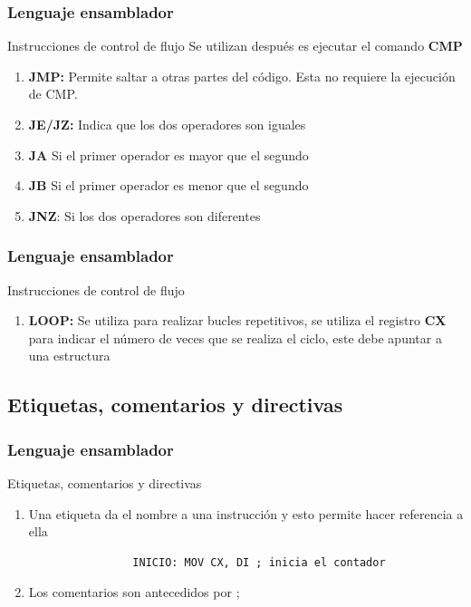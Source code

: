 \documentclass{beamer}
\begin{document}
\begin{frame}
	\frametitle{Lenguaje ensamblador}
	\begin{block}{Instrucciones de control de flujo}
	Se utilizan después es ejecutar el comando \textbf{CMP}
		\begin{enumerate}
			\item \textbf{JMP:} Permite saltar a otras partes del código. Esta no requiere la ejecución de CMP.
			\item \textbf{JE/JZ:} Indica que los dos operadores son iguales
			\item \textbf{JA} Si el primer operador es mayor que el segundo
			\item \textbf{JB} Si el primer operador es menor que el segundo
			\item \textbf{JNZ}: Si los dos operadores son diferentes
		\end{enumerate}
	\end{block}
\end{frame}

\begin{frame}
	\frametitle{Lenguaje ensamblador}
	\begin{block}{Instrucciones de control de flujo}
			\begin{enumerate}
			\item \textbf{LOOP:} Se utiliza para realizar bucles repetitivos, se utiliza el registro \textbf{CX} para indicar el número de veces que se realiza el ciclo, este debe apuntar a una estructura
		\end{enumerate}
	\end{block}
\end{frame}

\subsection{Etiquetas, comentarios y directivas}

\begin{frame}[fragile]
	\frametitle{Lenguaje ensamblador}
	\begin{block}{Etiquetas, comentarios y directivas}
			\begin{enumerate}
			\item Una etiqueta da el nombre a una instrucción y esto permite hacer referencia a ella
			\begin{lstlisting}
				INICIO: MOV CX, DI ; inicia el contador
			\end{lstlisting}
			\item Los comentarios son antecedidos por ;
		\end{enumerate}
	\end{block}
\end{frame}
\end{document}
